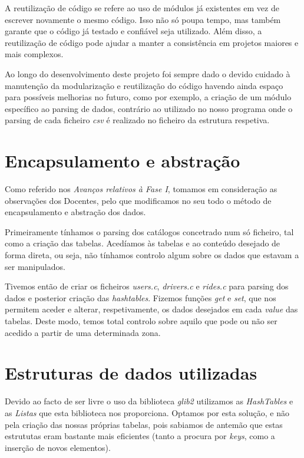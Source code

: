 \documentclass[12pt,a4paper]{article}
\begin{document}
    \par A reutilização de código se refere ao uso de módulos já existentes em vez de escrever novamente o mesmo código. Isso não só poupa tempo, mas também garante que o código já testado e confiável seja utilizado. Além disso, a reutilização de código pode ajudar a manter a consistência em projetos maiores e mais complexos.

    \par Ao longo do desenvolvimento deste projeto foi sempre dado o devido cuidado à manutenção da modularização e reutilização do código havendo ainda espaço para possíveis melhorias no futuro, como por exemplo, a criação de um módulo específico ao parsing de dados, contrário ao utilizado no nosso programa onde o parsing de cada ficheiro \textit{csv} é realizado no ficheiro da estrutura respetiva.
 
\section{Encapsulamento e abstração}
    \par Como referido nos \textit{Avanços relativos à Fase I}, tomamos em consideração as observações dos Docentes, pelo que modificamos no seu todo o método de encapsulamento e abstração dos dados.
    \par Primeiramente tínhamos o parsing dos catálogos concetrado num só ficheiro, tal como a criação das tabelas. Acedíamos às tabelas e ao conteúdo desejado de forma direta, ou seja, não tínhamos controlo algum sobre os dados que estavam a ser manipulados.
    \par Tivemos então de criar os ficheiros \textit{users.c}, \textit{drivers.c} e \textit{rides.c} para parsing dos dados e posterior criação das \textit{hashtables}. Fizemos funções \textit{get} e \textit{set}, que nos permitem aceder e alterar, respetivamente, os dados desejados em cada \textit{value} das tabelas. Deste modo, temos total controlo sobre aquilo que pode ou não ser acedido a partir de uma determinada zona.

 
\section{Estruturas de dados utilizadas}

    \par Devido ao facto de ser livre o uso da biblioteca \textit{glib2} utilizamos as \textit{HashTables} e as \textit{Listas} que esta biblioteca nos proporciona. Optamos por esta solução, e não pela criação das nossas próprias tabelas, pois sabiamos de antemão que estas estrututas eram bastante mais eficientes (tanto a procura por \textit{keys}, como a inserção de novos elementos). 
    
\end{document}
